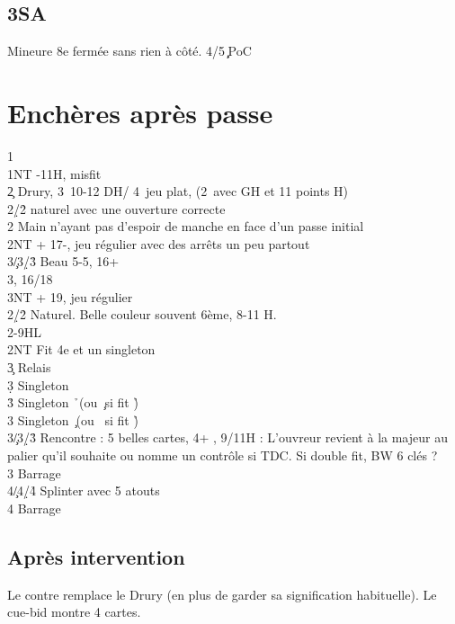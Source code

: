 \documentclass[a4paper]{article}
\begin{document}
\subsection{3SA}

Mineure 8e fermée sans rien à côté. 
4/5\c \d\ PoC

\section{Enchères après passe}

\begin{bidtable}
1\s\+\\
1NT -11H, misfit\\
2\c \> Drury, 3\s\ 10-12 DH/ 4\s\ jeu plat, (2\s\ avec GH et 11 points H)\+\\
2\d/2\h \> naturel avec une ouverture correcte\\
2\s \> Main n'ayant pas d'espoir de manche en face d'un passe initial\\
2NT + 17-, jeu régulier avec des arrêts un peu partout\\
3\c/3\d/3\h \> Beau 5-5, 16+\\
3\s {}\s , 16/18\\
3NT + 19, jeu régulier\-\\
2\d/2\h \> Naturel. Belle couleur souvent 6ème, 8-11 H.\\
2\s {}-9HL\\
2NT \> Fit 4e et un singleton\+\\
3\c \> Relais\+\\
3\d \> Singleton \d \\
3\h \> Singleton \h\ (ou \c\ si fit \h )\\
3\s \> Singleton \c\ (ou \s\ si fit \h )\-\-\\
3\c/3\d/3\h \> Rencontre : 5 belles cartes, 4+ \s , 9/11H : L'ouvreur revient à la majeur au palier qu'il souhaite ou nomme un contrôle si TDC. Si double fit, BW 6 clés ?\\
3\s \> Barrage\\
4\c/4\d/4\h \> Splinter avec 5 atouts\\
4\s \> Barrage\-
\end{bidtable}

\subsection{Après intervention}

Le contre remplace le Drury (en plus de garder sa signification habituelle). Le cue-bid montre 4 cartes.
\end{document}
